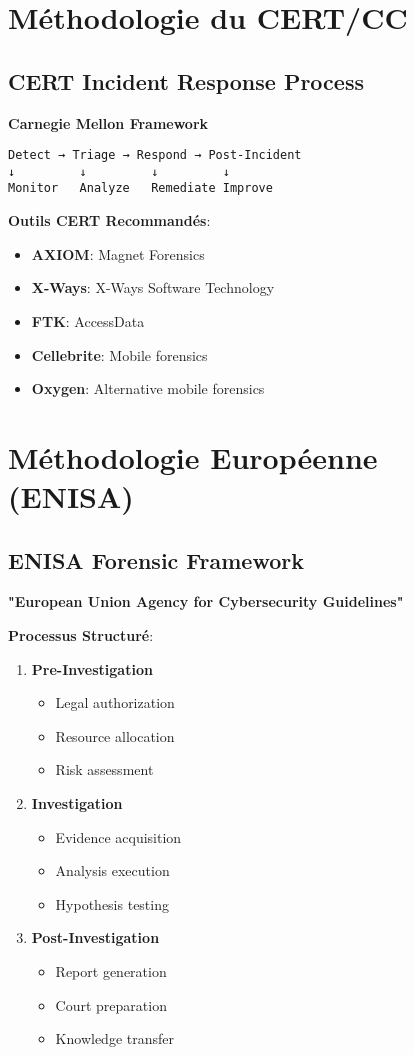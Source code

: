 \section{Méthodologie du CERT/CC}
\subsection{CERT Incident Response Process}
\textbf{Carnegie Mellon Framework}

\begin{verbatim}
Detect → Triage → Respond → Post-Incident
↓         ↓         ↓         ↓
Monitor   Analyze   Remediate Improve
\end{verbatim}

\textbf{Outils CERT Recommandés}:

\begin{itemize}
\item \textbf{AXIOM}: Magnet Forensics
\item \textbf{X-Ways}: X-Ways Software Technology
\item \textbf{FTK}: AccessData
\item \textbf{Cellebrite}: Mobile forensics
\item \textbf{Oxygen}: Alternative mobile forensics
\end{itemize}

\section{Méthodologie Européenne (ENISA)}
\subsection{ENISA Forensic Framework}
\textbf{"European Union Agency for Cybersecurity Guidelines"}

\textbf{Processus Structuré}:

\begin{enumerate}
\item \textbf{Pre-Investigation}
\begin{itemize}
\item Legal authorization
\item Resource allocation
\item Risk assessment
\end{itemize}

\item \textbf{Investigation}
\begin{itemize}
\item Evidence acquisition
\item Analysis execution
\item Hypothesis testing
\end{itemize}

\item \textbf{Post-Investigation}
\begin{itemize}
\item Report generation
\item Court preparation
\item Knowledge transfer
\end{itemize}
\end{enumerate}

